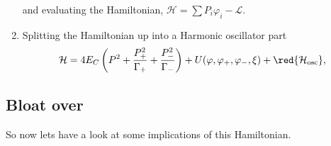 \begin{enumerate}
  	\noindent and evaluating the Hamiltonian, $ \mathcal{H} = \sum P_i\varphi_i - \mathcal{L} $.
  	\item Splitting the Hamiltonian up into a Harmonic oscillator part
  	\begin{equation}\label{key}
  		\mathcal{H} = 4E_C\left(P^2 + \frac{P_+^2}{\Gamma_+} + \frac{P_-^2}{\Gamma_-}\right) + U(\varphi, \varphi_+, \varphi_-, \xi) + \red{\mathcal{H}_\text{osc}},
  	\end{equation}
  	
  	\noindent {}
  \end{enumerate}

\subsection{Bloat over}
 So now lets have a look at some implications of this Hamiltonian.
 
